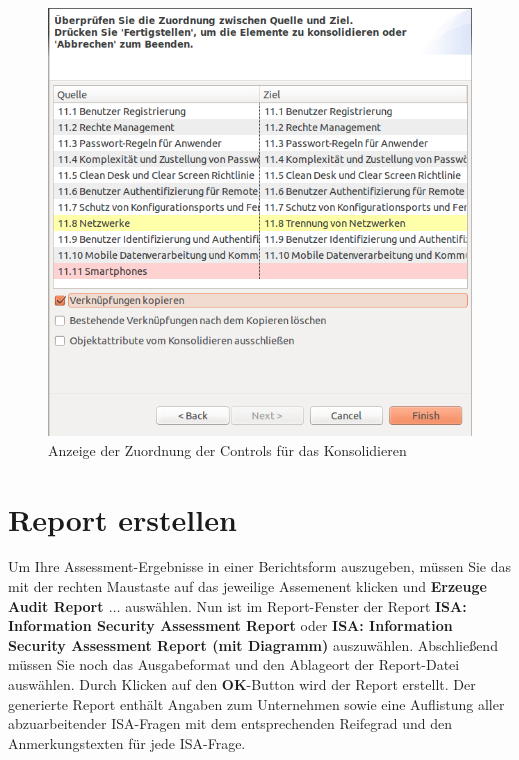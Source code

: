 \documentclass[a4paper,10pt]{book}
\begin{document}
\begin{figure}[htb!]
  \centering
  \includegraphics[scale=.63]{Screenshot/Isa_konsolidator_2.png}
  \caption{\label{Anzeige der Zuordnung der Controls fuer das Konsolidieren ...} Anzeige der Zuordnung der Controls für das Konsolidieren}
\end{figure}

\newpage

\section {Report erstellen} \label{Report erstellen} Um Ihre
Assessment-Ergebnisse in einer Berichtsform auszugeben, müssen Sie das
mit der rechten Maustaste auf das jeweilige Assemenent klicken und
\textbf{Erzeuge Audit Report $\hdots$} auswählen. Nun ist im
Report-Fenster der Report \textbf{ISA: Information Security Assessment
  Report} oder \textbf{ISA: Information Security Assessment Report
  (mit Diagramm)} auszuwählen. Abschließend müssen Sie noch das
Ausgabeformat und den Ablageort der Report-Datei auswählen. Durch
Klicken auf den \textbf{OK}-Button wird der Report erstellt.  Der
generierte Report enthält Angaben zum Unternehmen sowie eine
Auflistung aller abzuarbeitender ISA-Fragen mit dem entsprechenden
Reifegrad und den Anmerkungstexten für jede ISA-Frage.
\end{document}
